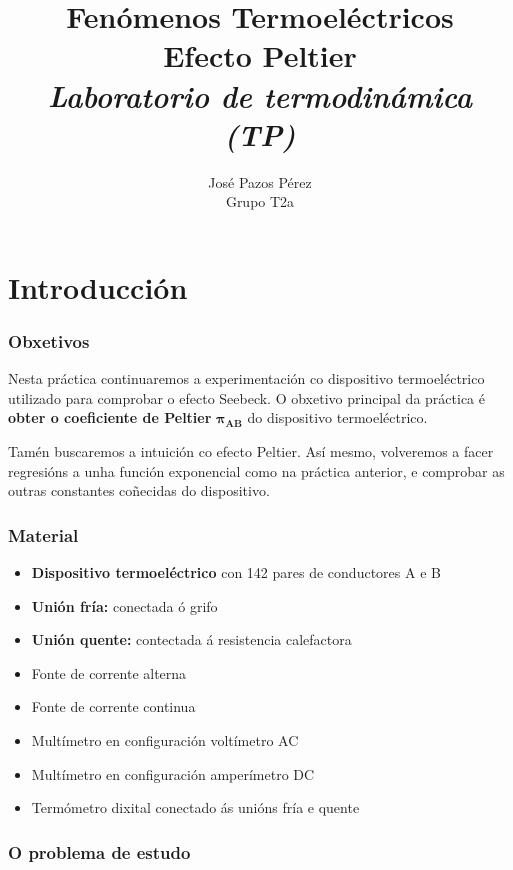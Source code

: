 \documentclass[12pt, a4paper, titlepage]{article}
\title{\textbf{Fenómenos Termoeléctricos\\\Huge{Efecto Peltier}}\\\textbf{\large \textit{Laboratorio de termodinámica (TP)}}}
\author{{\Large José Pazos Pérez}\\Grupo T2a}
\date{}
\begin{document}
  \maketitle

  \tableofcontents

  \newpage
  \part{Introducción}

  \section{Obxetivos}

  Nesta práctica continuaremos a experimentación co dispositivo termoeléctrico utilizado para comprobar o efecto Seebeck. O obxetivo principal da práctica é \textbf{obter o coeficiente de Peltier} $\mathbf{\pi_{AB}}$ do dispositivo termoeléctrico.

  Tamén buscaremos a intuición co efecto Peltier. Así mesmo, volveremos a facer regresións a unha función exponencial como na práctica anterior, e comprobar as outras constantes coñecidas do dispositivo.

  \section{Material}

  \begin{itemize}
    \item \textbf{Dispositivo termoeléctrico} con 142 pares de conductores A e B
    \item \textbf{Unión fría:} conectada ó grifo
    \item \textbf{Unión quente:} contectada á resistencia calefactora
    \item Fonte de corrente alterna
    \item Fonte de corrente continua
    \item Multímetro en configuración voltímetro AC
    \item Multímetro en configuración amperímetro DC
    \item Termómetro dixital conectado ás unións fría e quente
  \end{itemize}


  \section{O problema de estudo}
\end{document}
